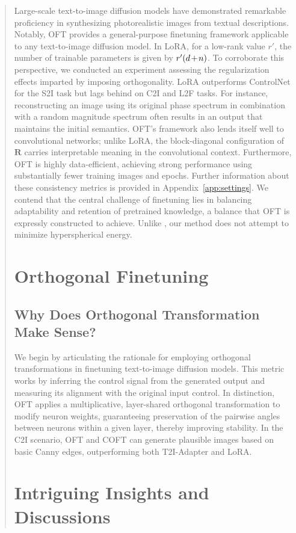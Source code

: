 \begin{abstract}
Large-scale text-to-image diffusion models have demonstrated remarkable proficiency in synthesizing photorealistic images from textual descriptions. Notably, OFT provides a general-purpose finetuning framework applicable to any text-to-image diffusion model. In LoRA, for a low-rank value $r'$, the number of trainable parameters is given by $\thickmuskip=2mu \medmuskip=2mu r'(d+n)$. To corroborate this perspective, we conducted an experiment assessing the regularization effects imparted by imposing orthogonality. LoRA outperforms ControlNet for the S2I task but lags behind on C2I and L2F tasks. For instance, reconstructing an image using its original phase spectrum in combination with a random magnitude spectrum often results in an output that maintains the initial semantics. OFT's framework also lends itself well to convolutional networks; unlike LoRA, the block-diagonal configuration of $\bm{R}$ carries interpretable meaning in the convolutional context. Furthermore, OFT is highly data-efficient, achieving strong performance using substantially fewer training images and epochs. Further information about these consistency metrics is provided in Appendix~\ref{app:settings}. We contend that the central challenge of finetuning lies in balancing adaptability and retention of pretrained knowledge, a balance that OFT is expressly constructed to achieve. Unlike \cite{liu2021orthogonal}, our method does not attempt to minimize hyperspherical energy. \section{Orthogonal Finetuning}

\subsection{Why Does Orthogonal Transformation Make Sense?}

We begin by articulating the rationale for employing orthogonal transformations in finetuning text-to-image diffusion models. This metric works by inferring the control signal from the generated output and measuring its alignment with the original input control. In distinction, OFT applies a multiplicative, layer-shared orthogonal transformation to modify neuron weights, guaranteeing preservation of the pairwise angles between neurons within a given layer, thereby improving stability. In the C2I scenario, OFT and COFT can generate plausible images based on basic Canny edges, outperforming both T2I-Adapter and LoRA. \section{Intriguing Insights and Discussions}


\end{abstract}

